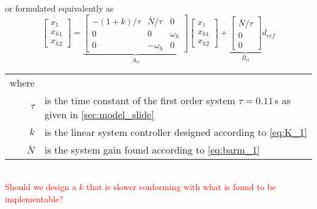 or formulated equivalently as
\begin{equation}
\dot{\begin{bmatrix}
	x_1\\x_{h1}\\x_{h2}
	\end{bmatrix}} =
\underbrace{\begin{bmatrix}
	-(1+k)/\tau & \bar{N}/\tau & 0\\0 & 0 & \omega_h \\ 0 & -\omega_h & 0
	\end{bmatrix}}_{A_{cl}}
\begin{bmatrix}
x_1\\x_{h1}\\x_{h2}
\end{bmatrix}+ 
\underbrace{\begin{bmatrix}
	\bar{N}/\tau \\ 0 \\ 0
	\end{bmatrix}}_{B_{cl}}
d_{ref}
\end{equation}
\begin{tabular}{rl}
where &\\
$\tau$ & is the time constant of the first order system $\tau=0.11$\,s as given in \autoref{sec:model_slide}\\
$k$ & is the linear system controller designed according to \autoref{eq:K_1}\\
$\bar{N}$ & is the system gain found according to \autoref{eq:barm_1}
\end{tabular}\\

\textcolor{red}{Should we design a $k$ that is slower conforming with what is found to be implementable?}

